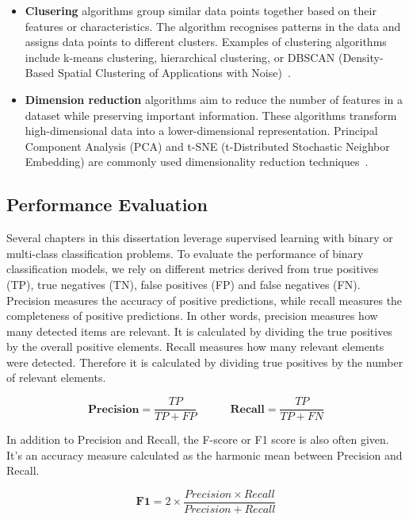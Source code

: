 \begin{itemize}
    \item \textbf{Clusering} algorithms group similar data points together based on their features or characteristics. The algorithm recognises patterns in the data and assigns data points to different clusters. Examples of clustering algorithms include k-means clustering, hierarchical clustering, or DBSCAN (Density-Based Spatial Clustering of Applications with Noise)~\cite{schubert2017dbscan,hartigan1979k}.

    \item \textbf{Dimension reduction} algorithms aim to reduce the number of features in a dataset while preserving important information. These algorithms transform high-dimensional data into a lower-dimensional representation. Principal Component Analysis (PCA) and t-SNE (t-Distributed Stochastic Neighbor Embedding) are commonly used dimensionality reduction techniques~\cite{van2008visualizing,abdi2010principal}.
\end{itemize}


\subsection{Performance Evaluation}
Several chapters in this dissertation leverage supervised learning with binary or multi-class classification problems. To evaluate the performance of binary classification models, we rely on different metrics derived from true positives (TP), true negatives (TN), false positives (FP) and false negatives (FN). Precision measures the accuracy of positive predictions, while recall measures the completeness of positive predictions. In other words, precision measures how many detected items are relevant. It is calculated by dividing the true positives by the overall positive elements. Recall measures how many relevant elements were detected. Therefore it is calculated by dividing true positives by the number of relevant elements. 

    \[
    \textbf{Precision} = \frac{TP}{TP+FP} \quad \quad \quad \textbf{Recall} = \frac{TP}{TP+FN}
    \]

In addition to Precision and Recall, the F-score or F1 score is also often given. It's an accuracy measure calculated as the harmonic mean between Precision and Recall.

    \[
    \textbf{F1} = 2 \times \frac{Precision \times Recall}{Precision + Recall}
    \]
    
